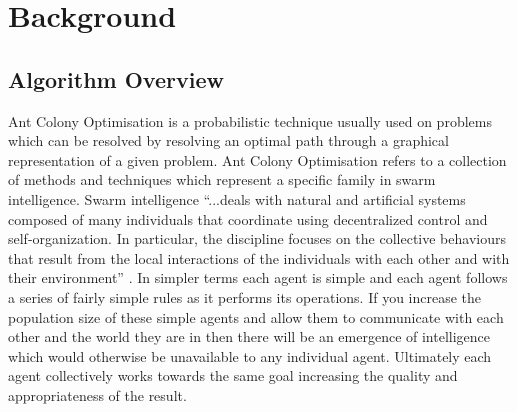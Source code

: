 \chapter{Background}

\section{Algorithm Overview}
\label{agloover}
Ant Colony Optimisation is a probabilistic technique usually used on problems which can be resolved by resolving an optimal path through a graphical representation of a given problem. Ant Colony Optimisation refers to a collection of methods and techniques which represent a specific family in swarm intelligence. Swarm intelligence \enquote{...deals with natural and artificial systems composed of many individuals that coordinate using decentralized control and self-organization. In particular, the discipline focuses on the collective behaviours that result from the local interactions of the individuals with each other and with their environment} \cite{SI:def}. In simpler terms each agent is simple and each agent follows a series of fairly simple rules as it performs its operations. If you increase the population size of these simple agents and allow them to communicate with each other and the world they are in then there will be an emergence of intelligence which would otherwise be unavailable to any individual agent. Ultimately each agent collectively works towards the same goal increasing the quality and appropriateness of the result.

